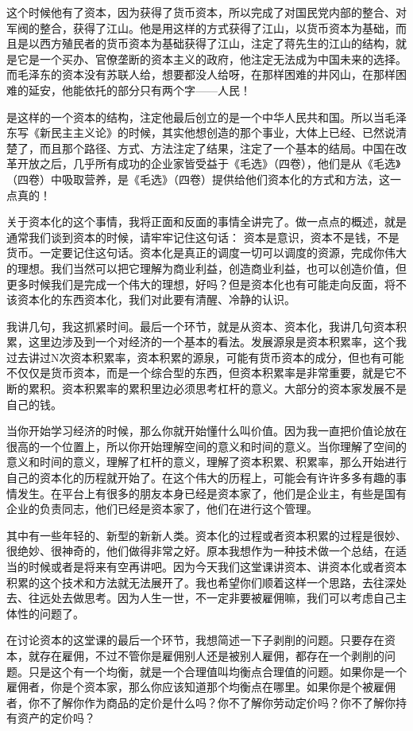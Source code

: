 \documentclass[UTF8, 12pt, a4paper]{ctexrep}
\begin{document}
这个时候他有了资本，因为获得了货币资本，所以完成了对国民党内部的整合、对军阀的整合，获得了江山。他是用这样的方式获得了江山，以货币资本为基础，而且是以西方殖民者的货币资本为基础获得了江山，注定了蒋先生的江山的结构，就是它是一个买办、官僚垄断的资本主义的政府，他注定无法成为中国未来的选择。而毛泽东的资本没有苏联人给，想要都没人给呀，在那样困难的井冈山，在那样困难的延安，他能依托的部分只有两个字——人民！

是这样的一个资本的结构，注定他最后创立的是一个中华人民共和国。所以当毛泽东写《新民主主义论》的时候，其实他想创造的那个事业，大体上已经、已然说清楚了，而且那个路径、方式、方法注定了结果，注定了一个基本的结局。中国在改革开放之后，几乎所有成功的企业家皆受益于《毛选》（四卷），他们是从《毛选》（四卷）中吸取营养，是《毛选》（四卷）提供给他们资本化的方式和方法，这一点真的！

关于资本化的这个事情，我将正面和反面的事情全讲完了。做一点点的概述，就是通常我们谈到资本的时候，请牢牢记住这句话： 资本是意识，资本不是钱，不是货币。一定要记住这句话。资本化是真正的调度一切可以调度的资源，完成你伟大的理想。我们当然可以把它理解为商业利益，创造商业利益，也可以创造价值，但更多时候我们是完成一个伟大的理想，好吗？但是资本化也有可能走向反面，将不该资本化的东西资本化，我们对此要有清醒、冷静的认识。

我讲几句，我这抓紧时间。最后一个环节，就是从资本、资本化，我讲几句资本积累，这里边涉及到一个对经济的一个基本的看法。发展源泉是资本积累率，这个我过去讲过N次资本积累率，资本积累的源泉，可能有货币资本的成分，但也有可能不仅仅是货币资本，而是一个综合型的东西，但资本积累率是非常重要，就是它不断的累积。资本积累率的累积里边必须思考杠杆的意义。大部分的资本家发展不是自己的钱。

当你开始学习经济的时候，那么你就开始懂什么叫价值。因为我一直把价值论放在很高的一个位置上，所以你开始理解空间的意义和时间的意义。当你理解了空间的意义和时间的意义，理解了杠杆的意义，理解了资本积累、积累率，那么开始进行自己的资本化的历程就开始了。在这个伟大的历程上，可能会有许许多多有趣的事情发生。在平台上有很多的朋友本身已经是资本家了，他们是企业主，有些是国有企业的负责同志，他们已经是资本家了，他们在进行这个管理。

其中有一些年轻的、新型的新新人类。资本化的过程或者资本积累的过程是很妙、很绝妙、很神奇的，他们做得非常之好。原本我想作为一种技术做一个总结，在适当的时候或者是将来有空再讲吧。因为今天我们这堂课讲资本、讲资本化或者资本积累的这个技术和方法就无法展开了。我也希望你们顺着这样一个思路，去往深处去、往远处去做思考。因为人生一世，不一定非要被雇佣嘛，我们可以考虑自己主体性的问题了。

在讨论资本的这堂课的最后一个环节，我想简述一下子剥削的问题。只要存在资本，就存在雇佣，不过不管你是雇佣别人还是被别人雇佣，都存在一个剥削的问题。只是这个有一个均衡，就是一个合理值叫均衡点合理值的问题。如果你是一个雇佣者，你是个资本家，那么你应该知道那个均衡点在哪里。如果你是个被雇佣者，你不了解你作为商品的定价是什么吗？你不了解你劳动定价吗？你不了解你持有资产的定价吗？
\end{document}
